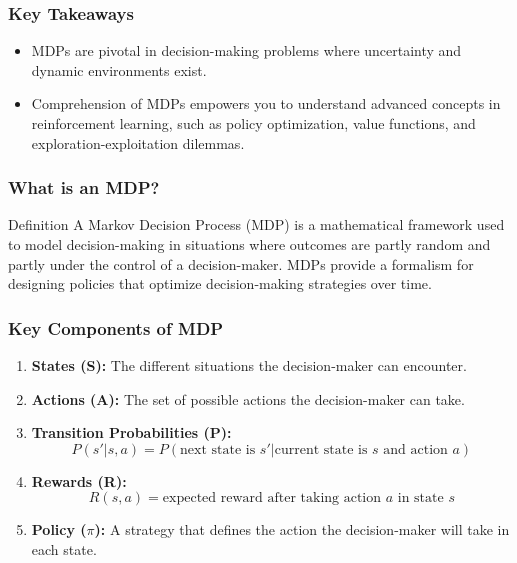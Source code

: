 \documentclass{beamer}
\begin{document}
\begin{frame}[fragile]
    \frametitle{Key Takeaways}
    \begin{itemize}
        \item MDPs are pivotal in decision-making problems where uncertainty and dynamic environments exist.
        \item Comprehension of MDPs empowers you to understand advanced concepts in reinforcement learning, such as policy optimization, value functions, and exploration-exploitation dilemmas.
    \end{itemize}
\end{frame}

\begin{frame}[fragile]
    \frametitle{What is an MDP?}
    
    \begin{block}{Definition}
        A Markov Decision Process (MDP) is a mathematical framework used to model decision-making in situations where outcomes are partly random and partly under the control of a decision-maker. MDPs provide a formalism for designing policies that optimize decision-making strategies over time.
    \end{block}
\end{frame}

\begin{frame}[fragile]
    \frametitle{Key Components of MDP}
    
    \begin{enumerate}
        \item \textbf{States (S):} The different situations the decision-maker can encounter.
        \item \textbf{Actions (A):} The set of possible actions the decision-maker can take.
        \item \textbf{Transition Probabilities (P):}
        \[
        P(s'|s,a) = P(\text{next state is } s' | \text{current state is } s \text{ and action } a)
        \]
        \item \textbf{Rewards (R):}
        \[
        R(s, a) = \text{expected reward after taking action } a \text{ in state } s
        \]
        \item \textbf{Policy ($\pi$):} A strategy that defines the action the decision-maker will take in each state.
    \end{enumerate}
\end{frame}
\end{document}
